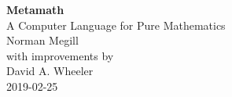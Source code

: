 \begin{center}
{\LARGE\bf Metamath} \\
\vspace{1ex}
{\large A Computer Language for Pure Mathematics} \\
\vspace{7ex}
{\large Norman Megill} \\
\vspace{7ex}
with improvements by \\
\vspace{1ex}
{\large David A. Wheeler} \\
\vspace{7ex}
2019-02-25
\end{center}

\vfill
\hfill

\newpage
\thispagestyle{empty}

\hfill
\vfill

